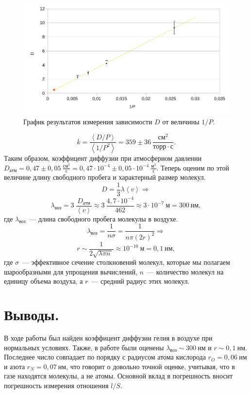 \documentclass[a4paper,11pt]{article}
\begin{document}
\begin{figure}[h!]\label{fig:img5}
  \centering
  \includegraphics[scale = 0.375]{graph5.png}
  \caption{График результатов измерения зависимости $D$ от величины $1/P$.}
\end{figure}
\[k = \frac{\left<D/P\right>}{\left<1/P^{2}\right>} = 359 \pm 36\ \frac{см^{2}}{торр \cdot с}.\]
Таким образом, коэффицент диффузии при атмосферном давлении $D_{атм} = 0,47 \pm 0,05\ \frac{см^{2}}{с} = 0,47 \cdot 10^{-4} \pm 0,05 \cdot 10^{-4}\ \frac{м^{2}}{с}.$
Теперь оценим по этой величине длину свободного пробега и характерный размер молекул.
\[D = \frac{1}{3} \lambda \left<v\right> \Rightarrow\]
\[ \lambda_{воз} = 3\ \frac{D_{атм}}{\left<v\right>} \approx 3\ \frac{4,7 \cdot 10 ^{-4}}{462} \approx 3 \cdot 10^{-7}\ м = 300\ нм,\]
где $\lambda_{воз}$~--- длина свободного пробега молекулы в воздухе.
\[ \lambda_{воз} = \frac{1}{n \sigma} = \frac{1}{n \pi \left(2r\right)^{2}} \Rightarrow\]
\[r \sim \frac{1}{2 \sqrt{\lambda \pi n\ }} \approx 10^{-10}\ м = 0,1\ нм,\]
где $\sigma$~--- эффективное сечение столкновений молекул, которые мы полагаем шарообразными для упрощения вычислений, $n$~--- количество молекул на единицу объема воздуха, а $r$~--- средний радиус этих молекул.
\section{Выводы.}
В ходе работы был найден коэффицент диффузии гелия в воздухе при нормальных условиях. Также, в работе были оценены $\lambda_{воз} \sim 300\ нм$ и $r \sim 0,1\ нм$. Последнее число совпадает по порядку с радиусом атома кислорода $r_{O} = 0,06\ нм$ и азота $r_{N} = 0,07\ нм$, что говорит о довольно точной оценке, учитывая, что в газе находятся молекулы, а не атомы. Основной вклад в погрешность вносит погрешность измерения отношения $l/S$.
\end{document}
